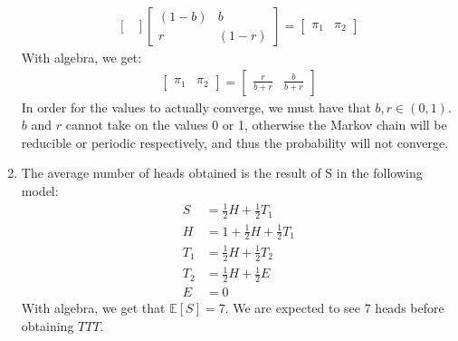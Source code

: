 \documentclass[a4paper]{article}
\newcommand{\E}{\mathbb{E}}
\newcommand{\<}{\langle}
\renewcommand{\>}{\rangle}
\renewcommand{\^}{\wedge}
\begin{document}
\begin{enumerate}
\begin{align*}
\begin{bmatrix}
                \end{bmatrix}
                \begin{bmatrix}
                (1-b) & b \\
                r & (1-r)
                \end{bmatrix}
                = 
                \begin{bmatrix}
                \pi_1 & \pi_2
                \end{bmatrix}
        \end{align*}
        With algebra, we get:
        \begin{align*}
            \begin{bmatrix}
                \pi_1 & \pi_2
            \end{bmatrix}
            =
            \begin{bmatrix}
                \frac{r}{b+r} & \frac{b}{b+r}
            \end{bmatrix}
        \end{align*}
        In order for the values to actually converge, we must have that $b,r \in (0,1)$. $b$ and $r$ cannot take on the values 0 or 1, otherwise the Markov chain will be reducible or periodic respectively, and thus the probability will not converge.
    \item
        The average number of heads obtained is the result of S in the following model:
        \begin{align*}
            S &= \frac{1}{2}H + \frac{1}{2}T_1 \\
            H &= 1 + \frac{1}{2}H + \frac{1}{2}T_1 \\
            T_1 &= \frac{1}{2}H + \frac{1}{2}T_2 \\
            T_2 &= \frac{1}{2}H + \frac{1}{2}E \\
            E &= 0
        \end{align*}
        With algebra, we get that $\E[S] = 7$. We are expected to see 7 heads before obtaining $TTT$.
\end{enumerate}
\end{document}

